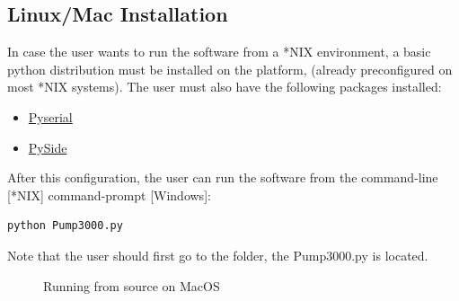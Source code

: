 \documentclass[letterpaper,10pt,english]{sphinxmanual}
\begin{document}
\subsection{Linux/Mac Installation}
\label{installation:linux-mac-installation}
In case the user wants to run the software from a *NIX environment, a basic python distribution
must be installed on the platform, (already preconfigured on most *NIX systems).
The user must also have the following packages installed:
\begin{itemize}
\item {} 
\href{http://pyserial.sourceforge.net/}{Pyserial}

\item {} 
\href{http://qt-project.org/wiki/pyside}{PySide}

\end{itemize}

After this configuration, the user can run the software from the command-line {[}*NIX{]}
command-prompt {[}Windows{]}:

\begin{Verbatim}[commandchars=\\\{\}]
python Pump3000.py
\end{Verbatim}

Note that the user should first go to the folder, the Pump3000.py is located.
\begin{figure}[htbp]
\centering
\capstart

\caption{Running from source on MacOS}\end{figure}
\end{document}
